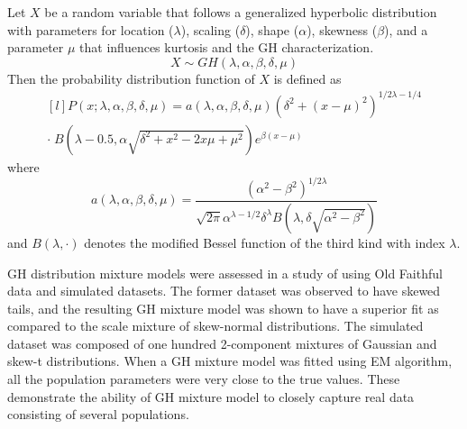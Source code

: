 Let \(X\) be a random variable that follows a generalized hyperbolic distribution with parameters for location (\(\lambda\)), scaling (\(\delta\)), shape (\(\alpha\)), skewness (\(\beta\)), and a parameter \(\mu\) that influences kurtosis and the GH characterization. 
\[
    X \sim GH(\lambda, \alpha, \beta, \delta, \mu)
\]
Then the probability distribution function of \(X\) is defined as
\begin{equation}
    \begin{aligned}[l]
    P(x; \lambda, \alpha, \beta, \delta, \mu) = a(\lambda, \alpha, \beta, \delta, \mu) (\delta^2+(x-\mu)^2)^{1/2\lambda-1/4} \\
    \cdot \; B(\lambda-0.5, \alpha\sqrt{\delta^2+x^2-2x\mu+\mu^2})e^{\beta(x-\mu)}
    \end{aligned}
\end{equation}
where
\[
    a(\lambda, \alpha, \beta, \delta, \mu) = \frac{(\alpha^2-\beta^2)^{1/2\lambda}}{\sqrt{2\pi}\alpha^{\lambda-1/2}\delta^\lambda B(\lambda, \delta\sqrt{\alpha^2 - \beta^2})}
\]
and \(B(\lambda, \cdot)\) denotes the modified Bessel function of the third kind with index \(\lambda\).

GH distribution mixture models were assessed in a study of  using Old Faithful data \cite{GeyserTimes} and simulated datasets. The former dataset was observed to have skewed tails, and the resulting GH mixture model was shown to have a superior fit as compared to the scale mixture of skew-normal distributions. The simulated dataset was composed of one hundred 2-component mixtures of Gaussian and skew-t distributions. When a GH mixture model was fitted using EM algorithm, all the population parameters were very close to the true values. These demonstrate the ability of GH mixture model to closely capture real data consisting of several populations.